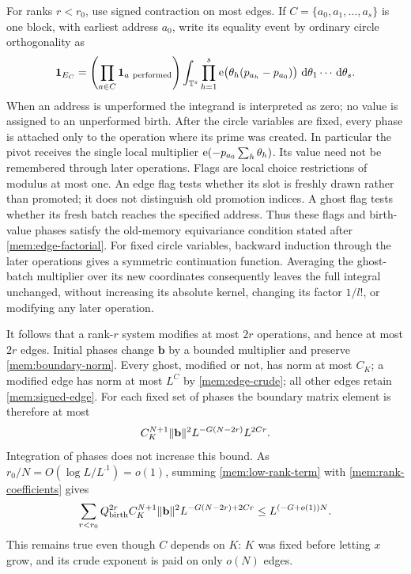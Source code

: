 For ranks $r<r_0$, use signed contraction on most edges. If
$C=\{a_0,a_1,\ldots,a_s\}$ is one block, with earliest address $a_0$,
write its equality event by ordinary circle orthogonality as
\begin{equation}\label{mem:local-phases}
 \mathbf{1}_{E_C}
 =\left(\prod_{a\in C}\mathbf{1}_{a\ \mathrm{performed}}\right)
   \int_{\mathbb T^s}
      \prod_{h=1}^s
          \mathrm{e}\bigl(\theta_h(p_{a_h}-p_{a_0})\bigr)
      \,\,\mathrm d\theta_1\cdots\,\mathrm d\theta_s.
\end{equation}
When an address is unperformed the integrand is interpreted as zero;
no value is assigned to an unperformed birth. After the circle
variables are fixed, every phase is attached only to the operation
where its prime was created. In particular the pivot receives the
single local multiplier
$\mathrm{e}(-p_{a_0}\sum_h\theta_h)$. Its value need not be remembered through
later operations. Flags are local choice restrictions of modulus at
most one. An edge flag tests whether its slot is freshly drawn rather
than promoted; it does not distinguish old promotion indices. A ghost
flag tests whether its fresh batch reaches the specified address.
Thus these flags and birth-value phases satisfy the old-memory
equivariance condition stated after \eqref{mem:edge-factorial}.
For fixed circle variables, backward induction through the later
operations gives a symmetric continuation function. Averaging the
ghost-batch multiplier over its new coordinates consequently leaves
the full integral unchanged, without increasing its absolute kernel,
changing its factor $1/l!$, or modifying any later operation.

It follows that a rank-$r$ system modifies at most $2r$ operations,
and hence at most $2r$ edges. Initial phases change $\mathbf b$ by a
bounded multiplier and preserve \eqref{mem:boundary-norm}. Every
ghost, modified or not, has norm at most $C_K$; a modified edge has
norm at most $L^C$ by \eqref{mem:edge-crude}; all other edges retain
\eqref{mem:signed-edge}. For each fixed set of phases the boundary
matrix element is therefore at most
\begin{equation}\label{mem:low-rank-term}
 C_K^{N+1}\lVert\mathbf b\rVert^2
       L^{-G(N-2r)} L^{2Cr}.
\end{equation}
Integration of phases does not increase this bound. As
$r_0/N=O(\log L/L^{.1})=o(1)$, summing
\eqref{mem:low-rank-term} with \eqref{mem:rank-coefficients} gives
\begin{equation}\label{mem:low-rank}
 \sum_{r<r_0}Q_{\mathrm{birth}}^{2r}
 C_K^{N+1}\lVert\mathbf b\rVert^2 L^{-G(N-2r)+2Cr}
       \le L^{(-G+o(1))N}.
\end{equation}
This remains true even though $C$ depends on $K$: $K$ was fixed
before letting $x$ grow, and its crude exponent is paid on only
$o(N)$ edges.

